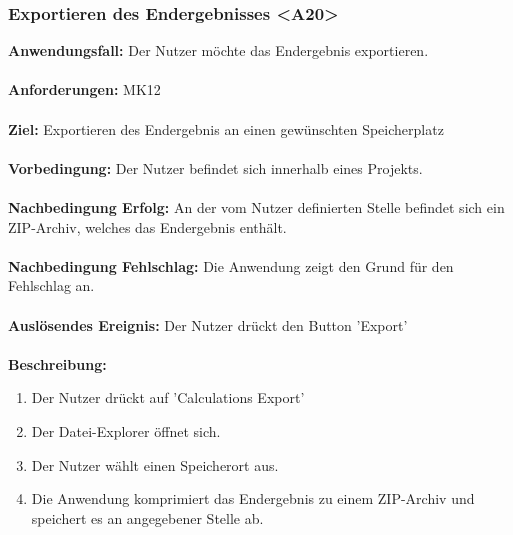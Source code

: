 \documentclass[parskip=full]{scrartcl} %
\begin{document}
\subsubsection*{Exportieren des Endergebnisses <A20>}
\textbf{Anwendungsfall:} Der Nutzer möchte das Endergebnis exportieren.\\\\
\textbf{Anforderungen:} MK12\\\\
\textbf{Ziel:} Exportieren des Endergebnis an einen gewünschten Speicherplatz\\\\
\textbf{Vorbedingung:}  Der Nutzer befindet sich innerhalb eines Projekts.\\\\
\textbf{Nachbedingung Erfolg:} An der vom Nutzer definierten Stelle befindet sich ein ZIP-Archiv, welches das Endergebnis enthält. \\\\
\textbf{Nachbedingung Fehlschlag:} Die Anwendung zeigt den Grund für den Fehlschlag an.\\\\
\textbf{Auslösendes Ereignis:} Der Nutzer drückt den Button 'Export' \\\\
\textbf{Beschreibung:}
\begin{enumerate}
    \item Der Nutzer drückt auf 'Calculations Export'
    \item Der Datei-Explorer öffnet sich.
    \item Der Nutzer wählt einen Speicherort aus.
    \item Die Anwendung komprimiert das Endergebnis zu einem ZIP-Archiv und speichert es an angegebener Stelle ab.
\end{enumerate}
\newpage
\end{document}
